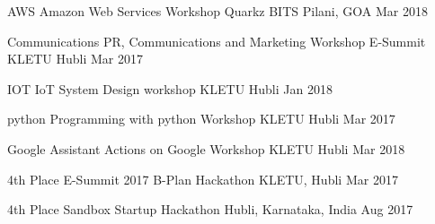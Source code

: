 




\begin{cvhonors}


\cvhonor
{AWS} %
{Amazon Web Services Workshop Quarkz} %
{BITS Pilani, GOA} %
{Mar 2018} %


\cvhonor
{Communications} %
{PR, Communications and Marketing Workshop E-Summit} %
{KLETU Hubli} %
{Mar 2017} %


\cvhonor
{IOT} %
{IoT System Design workshop} %
{KLETU Hubli} %
{Jan 2018} %


\cvhonor
{python} %
{Programming with python Workshop} %
{KLETU Hubli} %
{Mar 2017} %


\cvhonor
{Google Assistant} %
{Actions on Google Workshop} %
{KLETU Hubli} %
{Mar 2018} %


\end{cvhonors}



\begin{cvhonors}


\cvhonor
{4th Place} %
{E-Summit 2017 B-Plan Hackathon} %
{KLETU, Hubli} %
{Mar 2017} %


\cvhonor
{4th Place} %
{Sandbox Startup Hackathon} %
{Hubli, Karnataka, India} %
{Aug 2017} %


\end{cvhonors}

